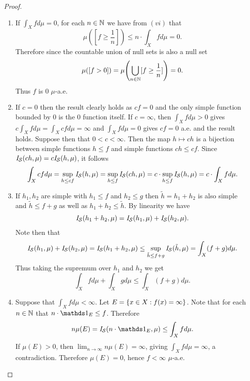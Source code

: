 \documentclass[hw_all.tex]{subfiles}
\begin{document}
\begin{proof}
\begin{enumerate}
        \item[(viii)]
            If $\int_X f d \mu = 0$, for each $n \in \mathbb{N}$ we have from $(vi)$ that
            \[
                \mu([f \geq \frac{1}{n}]) \leq n \cdot \int_X f d \mu = 0
            .\]
            Therefore since the countable union of null sets is also a null set
            \[
                \mu([f > 0]) = \mu\qty(\bigcup_{n \in \mathbb{N}} [f \geq \frac{1}{n}]) = 0
            .\]
            Thus $f$ is $0$ $\mu$-a.e.

        \item[(iii)]
            If $c = 0$ then the result clearly holds as $cf = 0$ and the only simple function bounded by $0$ is the $0$ function itself. If $c = \infty$, then $\int_X f d \mu > 0$ gives $c \int_X f d \mu = \int_X cf d \mu = \infty$ and $\int_X f d \mu = 0$ gives $cf = 0$ a.e. and the result holds. Suppose then that $0 < c < \infty$. Then the map $h \mapsto ch$ is a bijection between simple functions $h \leq f$ and simple functions $ch \leq cf$. Since $\mathit{I}_{\mathcal{S}}(ch, \mu) = c \mathit{I}_{\mathcal{S}}(h, \mu)$, it follows
            \[
                \int_X cf d \mu = \sup_{h \leq cf} \mathit{I}_{\mathcal{S}}(h, \mu) = \sup_{h \leq f} \mathit{I}_{\mathcal{S}}(ch, \mu) = c\cdot \sup_{h \leq f} \mathit{I}_{\mathcal{S}}(h, \mu) = c \cdot \int_X f d \mu
            .\]

        \item[(iv)]
            If $h_1, h_2$ are simple with $h_1 \leq f$ and $h_2 \leq g$ then $\tilde{h} = h_1 + h_2$ is also simple and $\tilde{h} \leq f + g$ as well as $h_1 + h_2 \leq \tilde{h}$. By linearity we have
            \[
                \mathit{I}_{\mathcal{S}}(h_1 + h_2, \mu) = \mathit{I}_{\mathcal{S}}(h_1, \mu) + \mathit{I}_{\mathcal{S}}(h_2, \mu)
            .\]
            Note then that
            \[
                \mathit{I}_{\mathcal{S}}(h_1, \mu) + \mathit{I}_{\mathcal{S}}(h_2, \mu) = \mathit{I}_{\mathcal{S}}(h_1 + h_2, \mu) \leq \sup_{\tilde{h} \leq f + g} \mathit{I}_{\mathcal{S}}(\tilde{h}, \mu) = \int_X (f + g) d \mu
            .\]
            Thus taking the supremum over $h_1$ and $h_2$ we get
            \[
                \int_X f d \mu + \int_X g d \mu \leq \int_X (f+g) d \mu
            .\]

        \item[(vii)]
            Suppose that $\int_X f d \mu < \infty$. Let $E = \qty{x \in X : f(x) = \infty}$. Note that for each $n \in \mathbb{N}$ that $n \cdot \ind{E} \leq f$. Therefore
            \[
                n \mu(E) = \sint(n \cdot \ind{E}, \mu) \leq \int_X f d \mu
            .\]
            If $\mu(E) > 0$, then $\lim_{n \to \infty} n \mu(E) = \infty$, giving $\int_X f d \mu = \infty$, a contradiction. Therefore $\mu(E) = 0$, hence $f < \infty$ $\mu$-a.e.


\end{enumerate}
\end{proof}
\end{document}
